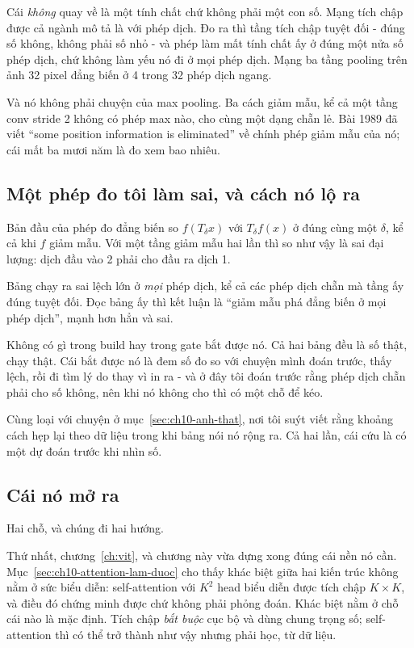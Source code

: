 Cái \emph{không} quay về là một tính chất chứ không phải một con số. Mạng tích
chập được cả ngành mô tả là  với phép dịch. Đo ra thì
tầng tích chập  tuyệt đối - đúng số không, không
phải số nhỏ - và phép  làm
mất tính chất ấy ở đúng một nửa số phép dịch, chứ không làm yếu nó đi ở mọi
phép dịch. Mạng ba tầng pooling trên ảnh 32 pixel đẳng biến ở 4 trong 32 phép
dịch ngang.

Và nó không phải chuyện của max pooling. Ba cách giảm mẫu, kể cả một tầng conv
stride 2 không có phép max nào, cho cùng một dạng chẵn lẻ. Bài 1989 đã viết
\enquote{some position information is eliminated} về chính phép giảm mẫu của
nó; cái mất ba mươi năm là đo xem bao nhiêu.

\subsection*{Một phép đo tôi làm sai, và cách nó lộ ra}

%
Bản đầu của phép đo đẳng biến so \(f(T_\delta x)\) với \(T_\delta f(x)\) ở đúng
cùng một \(\delta\), kể cả khi \(f\) giảm mẫu. Với một tầng giảm mẫu hai lần
thì so như vậy là sai đại lượng: dịch đầu vào 2 phải cho đầu ra dịch 1.

Bảng chạy ra sai lệch lớn ở \emph{mọi} phép dịch, kể cả các phép dịch chẵn mà
tầng ấy đúng tuyệt đối. Đọc bảng ấy thì kết luận là \enquote{giảm mẫu phá đẳng
biến ở mọi phép dịch}, mạnh hơn hẳn và sai.

Không có gì trong build hay trong gate bắt được nó. Cả hai bảng đều là số thật,
chạy thật. Cái bắt được nó là đem số đo so với chuyện mình đoán trước, thấy
lệch, rồi đi tìm lý do thay vì in ra - và ở đây tôi đoán trước rằng phép dịch
chẵn phải cho số không, nên khi nó không cho thì có một chỗ để kéo.

Cùng loại với chuyện ở mục~\ref{sec:ch10-anh-that}, nơi tôi suýt viết rằng
khoảng cách hẹp lại theo dữ liệu trong khi bảng nói nó rộng ra. Cả hai lần, cái
cứu là có một dự đoán trước khi nhìn số.

\subsection*{Cái nó mở ra}

%
Hai chỗ, và chúng đi hai hướng.

Thứ nhất, chương~\ref{ch:vit}, và chương này vừa dựng xong đúng cái nền nó cần.
Mục~\ref{sec:ch10-attention-lam-duoc} cho thấy khác biệt giữa hai kiến trúc
không nằm ở sức biểu diễn: self-attention với \(K^2\) head biểu diễn được tích
chập \(K \times K\), và điều đó chứng minh được chứ không phải phỏng đoán. Khác
biệt nằm ở chỗ cái nào là mặc định. Tích chập \emph{bắt buộc} cục bộ và dùng
chung trọng số; self-attention thì có thể trở thành như vậy nhưng phải học, từ
dữ liệu.


